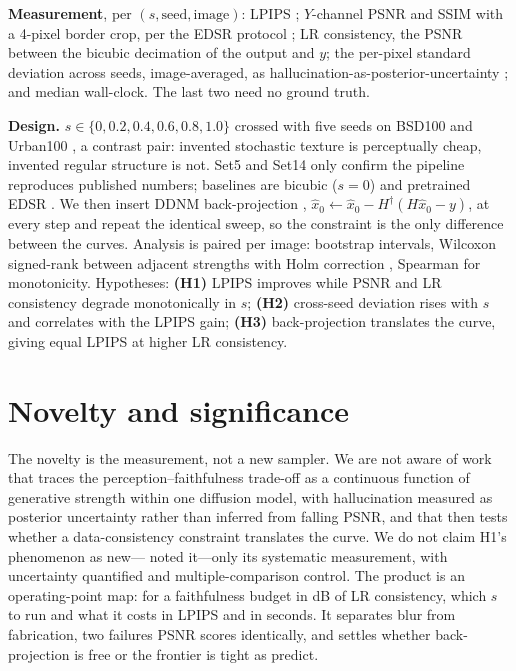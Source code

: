 \documentclass{article}
\begin{document}
\textbf{Measurement}, per $(s, \text{seed}, \text{image})$: LPIPS
\citep{zhang2018lpips}; $Y$-channel PSNR and SSIM \citep{wang2004ssim} with a
4-pixel border crop, per the EDSR protocol \citep{lim2017edsr}; LR consistency,
the PSNR between the bicubic decimation of the output and $y$; the per-pixel
standard deviation across seeds, image-averaged, as
hallucination-as-posterior-uncertainty \citep{cohen2024looks}; and median
wall-clock. The last two need no ground truth.

\textbf{Design.} $s \in \{0, 0.2, 0.4, 0.6, 0.8, 1.0\}$ crossed with five seeds
on BSD100 \citep{martin2001bsds} and Urban100 \citep{huang2015urban100}, a
contrast pair: invented stochastic texture is perceptually cheap, invented
regular structure is not. Set5 and Set14 only confirm the pipeline
reproduces published numbers; baselines are bicubic ($s=0$) and pretrained EDSR
\citep{lim2017edsr}. We then insert DDNM back-projection \citep{wang2023ddnm},
$\hat{x}_0 \leftarrow \hat{x}_0 - H^\dagger(H\hat{x}_0 - y)$, at every step
and repeat the identical sweep, so the constraint is the only difference between
the curves. Analysis is paired per image: bootstrap intervals,
Wilcoxon signed-rank between adjacent strengths with Holm correction
\citep{holm1979simple}, Spearman for monotonicity. Hypotheses: \textbf{(H1)}
LPIPS improves while PSNR and LR consistency degrade monotonically in $s$;
\textbf{(H2)} cross-seed deviation rises with $s$ and correlates with the LPIPS
gain; \textbf{(H3)}
back-projection translates the curve, giving equal LPIPS at higher LR
consistency.

\section{Novelty and significance}

The novelty is the measurement, not a new sampler. We are not aware of work
that traces the perception--faithfulness trade-off as a continuous function of
generative strength within one diffusion model, with hallucination measured as
posterior uncertainty rather than inferred from falling PSNR, and that then
tests whether a data-consistency constraint translates the curve. We do not claim
H1's phenomenon as new---\citet{tivnan2024hallucination} noted it---only its
systematic measurement, with uncertainty quantified and multiple-comparison
control. The product is an operating-point map: for a faithfulness budget in dB
of LR consistency, which $s$ to run and what it costs in LPIPS and in seconds.
It separates blur from fabrication, two failures PSNR scores identically, and
settles whether back-projection is free or the frontier is tight as
\citet{blau2018perception} predict.
\end{document}
